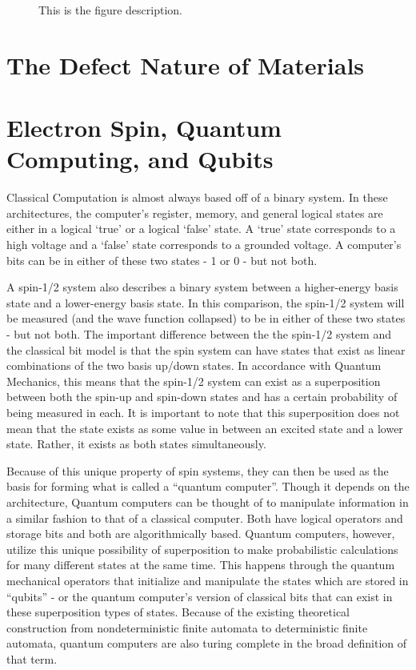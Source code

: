 \documentclass[oneside, astronomy, noacknowlegments]{BYUPhys}
\begin{document}
\begin{figure}
    \caption[Zeeman effect and resonant conditions in matter]{\label{fig:Zeeman}
     This is the figure description.}
\end{figure}

\section{The Defect Nature of Materials}
\label{sec:Defects}

\section{Electron Spin, Quantum Computing, and Qubits}
\label{sec:QuantumComputers}

Classical Computation is almost always based off of a binary system. In these architectures, the computer’s register, memory, and general logical states are either in a logical ‘true’ or a logical ‘false’ state. A ‘true’ state corresponds to a high voltage and a ‘false’ state corresponds to a grounded voltage. A computer’s bits can be in either of these two states - 1 or 0 - but not both.

A spin-1/2 system also describes a binary system between a higher-energy basis state and a lower-energy basis state. In this comparison, the spin-1/2 system will be measured (and the wave function collapsed) to be in either of these two states - but not both. The important difference between the the spin-1/2 system and the classical bit model is that the spin system can have states that exist as linear combinations of the two basis up/down states. In accordance with Quantum Mechanics, this means that the spin-1/2 system can exist as a superposition between both the spin-up and spin-down states and has a certain probability of being measured in each. It is important to note that this superposition does not mean that the state exists as some value in between an excited state and a lower state. Rather, it exists as both states simultaneously.

Because of this unique property of spin systems, they can then be used as the basis for forming what is called a “quantum computer”. Though it depends on the architecture, Quantum computers can be thought of to manipulate information in a similar fashion to that of a classical computer. Both have logical operators and storage bits and both are algorithmically based. Quantum computers, however, utilize this unique possibility of superposition to make probabilistic calculations for many different states at the same time. This happens through the quantum mechanical operators that initialize and manipulate the states which are stored in “qubits” - or the quantum computer’s version of classical bits that can exist in these superposition types of states. Because of the existing theoretical construction from nondeterministic finite automata to deterministic finite automata, quantum computers are also turing complete in the broad definition of that term.
\end{document}
